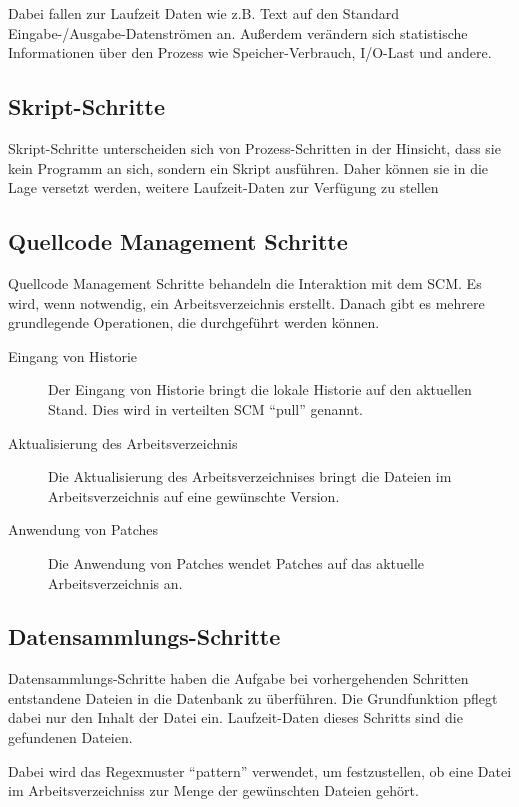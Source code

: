 Dabei fallen zur Laufzeit Daten wie z.B. Text auf den Standard Eingabe-/Ausgabe-Datenströmen an.
Außerdem verändern sich statistische Informationen über den Prozess wie Speicher-Verbrauch, I/O-Last und andere.


\subsection{Skript-Schritte}

Skript-Schritte unterscheiden sich von Prozess-Schritten in der Hinsicht,
dass sie kein Programm an sich, sondern ein Skript ausführen.
Daher können sie in die Lage versetzt werden,
weitere Laufzeit-Daten zur Verfügung zu stellen


\subsection{Quellcode Management Schritte}

Quellcode Management Schritte behandeln die Interaktion mit dem SCM.
Es wird, wenn notwendig, ein Arbeitsverzeichnis erstellt.
Danach gibt es mehrere grundlegende Operationen, die durchgeführt werden können.

\begin{description}
    \item[Eingang von Historie]
        Der Eingang von Historie bringt die lokale Historie auf den aktuellen Stand. Dies wird in verteilten \ac{SCM} ``pull'' genannt.
    \item[Aktualisierung des Arbeitsverzeichnis]
        Die Aktualisierung des Arbeitsverzeichnises bringt die Dateien im Arbeitsverzeichnis auf eine gewünschte Version.
    \item[Anwendung von Patches]
        Die Anwendung von Patches wendet Patches auf das aktuelle Arbeitsverzeichnis an.
\end{description}


\subsection{Datensammlungs-Schritte}

Datensammlungs-Schritte haben die Aufgabe
bei vorhergehenden Schritten entstandene Dateien 
in die Datenbank zu überführen.
Die Grundfunktion pflegt dabei nur den Inhalt der Datei ein.
Laufzeit-Daten dieses Schritts sind die gefundenen Dateien.

Dabei wird das Regexmuster ``pattern'' verwendet, um festzustellen,
ob eine Datei im Arbeitsverzeichniss zur Menge der gewünschten Dateien gehört.

